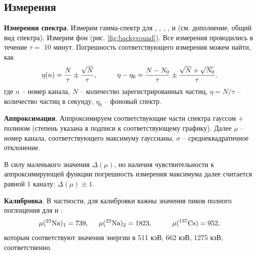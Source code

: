 \subsection*{Измерения}

\textbf{Измерения спектра}.
Измерим гамма-спектр для \na, \cs, \co, \am, и \eu (см. дополнение, общий вид спектра). Измерим фон (рис. \ref{fig:background}). Все измерения проводились в течение $\tau = $ 10 минут. Погрешность соответствующего измерения можем найти, как
\begin{equation*}
    \eta(n) = \frac{N }{\tau}\pm \frac{\sqrt{N}}{\tau},
    \hspace{10 mm} 
    \eta - \eta_0 = 
    \frac{N-N_0}{\tau}\pm \frac{\sqrt{N}+\sqrt{N_0}}{\tau}.
\end{equation*}
где $n$ -- номер канала, $N$ -- количество зарегистрированных частиц, $\eta = N/\tau$ -- количество частиц в секунду, $\eta_0$ -- фоновый спектр.


\textbf{Аппроксимация}.
Аппроксимируем соответствующие части спектра гауссом $+$ полином (степень указана в подписи к соответствующему графику). Далее $\mu$ -- номер канала, соответствующего максимуму гауссианы, $\sigma$ -- среднеквадратичное отклонение.

В силу маленького значения $\Delta(\mu)$, но наличия чувствительности к аппроксимирующей функции погрешность измерения максимума далее считается равной 1 каналу: $\Delta(\mu) \equiv 1$. 


\textbf{Калибровка}.
В частности, для калибровки важны значения пиков полного поглощения для \na и \cs:
\begin{equation*}
    \mu(\text{\na})_1 = 739,
    \hspace{5 mm} 
    \mu(\text{\na})_2 = 1823,
    \hspace{10 mm} 
    \mu(\text{\cs}) = 952,
\end{equation*}
которым соответствуют значения энергии в 511 кэВ, 662 кэВ, 1275 кэВ, соответственно.

